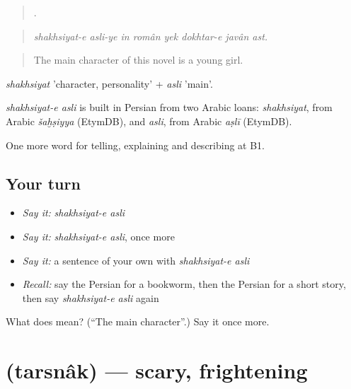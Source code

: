 \begin{quote}
       .
\end{quote}

\begin{quote}
\emph{shakhsiyat-e asli-ye in român yek dokhtar-e javân ast.}
\end{quote}

\begin{quote}
The main character of this novel is a young girl.
\end{quote}

\emph{shakhsiyat} 'character, personality' + \emph{asli} 'main'.

\begin{cousinweb}
\emph{shakhsiyat-e asli} is built in Persian from two Arabic loans: \emph{shakhsiyat}, from Arabic \emph{šaḫṣiyya} (EtymDB), and \emph{asli}, from Arabic \emph{aṣlī} (EtymDB).
\end{cousinweb}

\begin{grammarlens}[title={What you've built}]
One more word for telling, explaining and describing at B1.
\end{grammarlens}

\subsection*{Your turn}
\begin{itemize}
\raggedright
  \item \emph{Say it:} \emph{shakhsiyat-e asli}
  \item \emph{Say it:} \emph{shakhsiyat-e asli}, once more
  \item \emph{Say it:} a sentence of your own with \emph{shakhsiyat-e asli}
  \item \emph{Recall:} say the Persian for a bookworm, then the Persian for a short story, then say \emph{shakhsiyat-e asli} again
\end{itemize}

\begin{tcolorbox}[breakable,colback=teal!4,colframe=teal!35!black,title={Before you move on}]
What does   mean? (\textquotedblleft{}The main character\textquotedblright{}.) Say it once more.
\end{tcolorbox}
\section[\texorpdfstring{\fa{ترسناک} (tarsnâk)}{ترسناک (tarsnâk)}]{ (tarsnâk) — scary, frightening}

